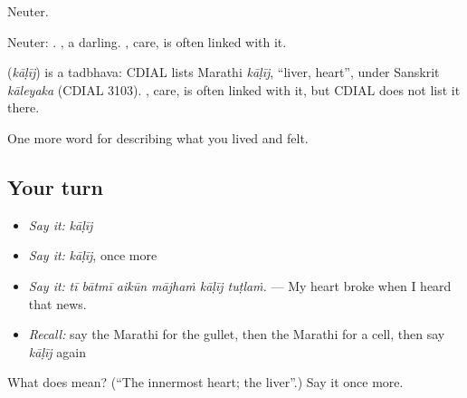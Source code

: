 Neuter.

Neuter:  .  , a darling. , care, is often linked with it.

\begin{cousinweb}
\textbf{} (\emph{kāḷīj}) is a tadbhava: CDIAL lists Marathi \emph{kāḷīj}, \textquotedblleft{}liver, heart\textquotedblright{}, under Sanskrit \emph{kāleyaka} (CDIAL 3103). , care, is often linked with it, but CDIAL does not list it there.
\end{cousinweb}

\begin{grammarlens}[title={What you've built}]
One more word for describing what you lived and felt.
\end{grammarlens}

\subsection*{Your turn}
\begin{itemize}
\raggedright
  \item \emph{Say it:} \emph{kāḷīj}
  \item \emph{Say it:} \emph{kāḷīj}, once more
  \item \emph{Say it:} \emph{tī bātmī aikūn mājhaṁ kāḷīj tuṭlaṁ.} — My heart broke when I heard that news.
  \item \emph{Recall:} say the Marathi for the gullet, then the Marathi for a cell, then say \emph{kāḷīj} again
\end{itemize}

\begin{tcolorbox}[breakable,colback=teal!4,colframe=teal!35!black,title={Before you move on}]
What does  mean? (\textquotedblleft{}The innermost heart; the liver\textquotedblright{}.) Say it once more.
\end{tcolorbox}
